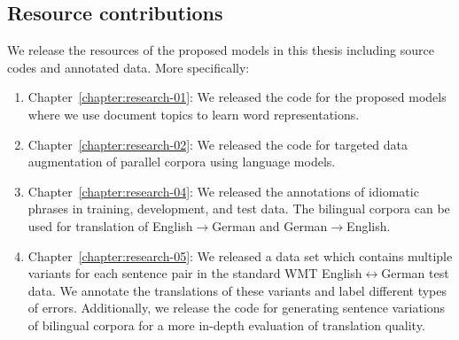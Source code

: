 \subsection{Resource contributions}

We release the resources of the proposed models in this thesis including source codes and annotated data. More specifically:

\begin{enumerate}
\item Chapter~\ref{chapter:research-01}: We released the code for the proposed models where we use document topics to learn word representations.
\item Chapter~\ref{chapter:research-02}: We released the code for targeted data augmentation of parallel corpora using language models.
\item Chapter~\ref{chapter:research-04}: We released the annotations of idiomatic phrases in training, development, and test data. The bilingual corpora can be used for translation of English$\rightarrow$German and German$\rightarrow$English.
\item Chapter~\ref{chapter:research-05}: We released a data set which contains multiple variants for each sentence pair in the standard WMT English$\leftrightarrow$German test data.
We annotate the translations of these variants and label different types of errors. Additionally, we release the code for generating sentence variations of bilingual corpora for a more in-depth evaluation of translation quality.
\end{enumerate}






